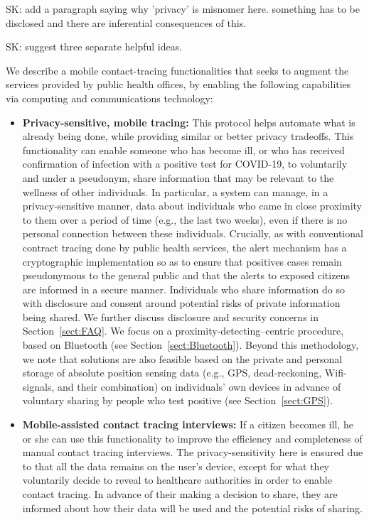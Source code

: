 \documentclass{article}
\newcommand{\sk}[1]{\textsf{\color{magenta} SK: #1}}
\begin{document}
\sk{add a paragraph saying why 'privacy' is misnomer here. something has to be disclosed and there are inferential consequences of this.}

\sk{suggest three separate helpful ideas.}

We describe a mobile contact-tracing functionalities that seeks to augment the services provided by public health offices, by enabling the following capabilities via computing and communications technology:

\begin{itemize}
\item \textbf{Privacy-sensitive, mobile tracing:}  This protocol helps automate what is already being done, while providing similar or better privacy tradeoffs.
This functionality can enable someone who has become ill, or who has received confirmation of infection with a positive test for COVID-19, to voluntarily and under a pseudonym, share information that may be relevant to the wellness of other individuals.  In particular, a system can manage, in a privacy-sensitive manner, data about individuals who came in close proximity to them over a period of time (e.g., the last two weeks), even if there is no personal connection between these individuals.
Crucially, as with conventional contract tracing done by public health services, the alert mechanism has a cryptographic implementation so as to ensure that positives cases remain pseudonymous to the general public and that the alerts to exposed citizens are informed in a secure manner. Individuals who share information do so with disclosure and consent around potential risks of private information being shared. We further discuss disclosure and security concerns in Section~\ref{sect:FAQ}. We focus on a proximity-detecting--centric procedure, based on Bluetooth (see Section~\ref{sect:Bluetooth}). Beyond this methodology, we note that solutions are also feasible based on the private and personal storage of absolute position sensing data (e.g., GPS, dead-reckoning, Wifi-signals, and their combination) on individuals' own devices in advance of voluntary sharing by people who test positive (see Section~\ref{sect:GPS}).


\item \textbf{Mobile-assisted contact tracing interviews:}  If a citizen becomes ill, he or she can use this functionality to improve the efficiency and completeness of manual contact tracing interviews. The privacy-sensitivity here is ensured due to that all the data remains on the user's device, except for what they voluntarily decide to reveal to healthcare authorities in order to enable contact tracing. In advance of their making a decision to share, they are informed about how their data will be used and the potential risks of sharing.


\end{itemize}
\end{document}
